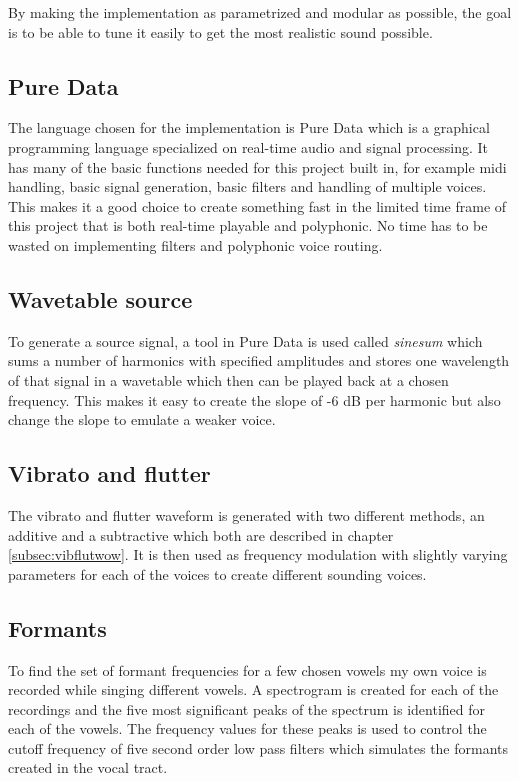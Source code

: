 \documentclass{article}
\begin{document}
By making the implementation as parametrized and modular as possible, the goal is to be able to tune it easily to get the most realistic sound possible.

\subsection{Pure Data}
The language chosen for the implementation is Pure Data which is a graphical programming language specialized on real-time audio and signal processing. It has many of the basic functions needed for this project built in, for example midi handling, basic signal generation, basic filters and handling of multiple voices. This makes it a good choice to create something fast in the limited time frame of this project that is both real-time playable and polyphonic. No time has to be wasted on implementing filters and polyphonic voice routing.

\subsection{Wavetable source}
To generate a source signal, a tool in Pure Data is used called \textit{sinesum} which sums a number of harmonics with specified amplitudes and stores one wavelength of that signal in a wavetable which then can be played back at a chosen frequency. This makes it easy to create the slope of -6 dB per harmonic but also change the slope to emulate a weaker voice.

\subsection{Vibrato and flutter}
The vibrato and flutter waveform is generated with two different methods, an additive and a subtractive which both are described in chapter \ref{subsec:vibflutwow}. It is then used as frequency modulation with slightly varying parameters for each of the voices to create different sounding voices.

\subsection{Formants}
To find the set of formant frequencies for a few chosen vowels my own voice is recorded while singing different vowels. A spectrogram is created for each of the recordings and the five most significant peaks of the spectrum is identified for each of the vowels. The frequency values for these peaks is used to control the cutoff frequency of five second order low pass filters which simulates the formants created in the vocal tract.
\end{document}
